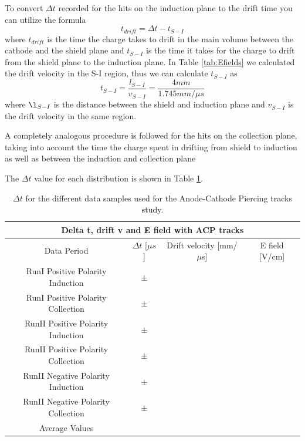 To convert $\Delta t$ recorded for the hits on the induction plane to the drift time you can utilize the formula
\begin{equation}
t_{drift} = \Delta t - t_{S-I}
\end{equation}
where $t_{drift}$ is the time the charge takes to drift in the main volume between the cathode and the shield plane and $t_{S-I}$ is the time it takes for the charge to drift from the shield plane to the induction plane. In Table \ref{tab:Efields} we calculated the drift velocity in the S-I region, thus we can calculate $t_{S-I}$ as 
\begin{equation}
t_{S-I} = \frac{l_{S-I}}{v_{S-I}} = \frac{4 mm}{1.745 mm/ \mu s}
\end{equation}
where $\l_{S-I}$ is the distance between the shield and induction plane and $v_{S-I}$ is the drift velocity in the same region.

A completely analogous procedure is followed for the hits on the collection plane, taking into account the time the charge spent in drifting from shield to induction as well as between the induction and collection plane

The $\Delta t$ value for each distribution is shown in Table \ref{tab:deltaTACP}.

\begin{center}
\begin{table}[htb]
  \begin{center}
    \begin{tabular}{|c|c|c|c|}
      \multicolumn{4}{c}{\textbf{Delta t, drift v and E field with ACP tracks}} \\
      \hline \hline
       Data Period  & $\Delta t$ [$\mu s$] & Drift velocity [mm/$\mu$s] & E field [V/cm] \\
       \hline
       RunI Positive Polarity Induction &  $\pm$   &  & \\
       \hline
       RunI Positive Polarity Collection &  $\pm$  &  &  \\
       \hline
       RunII Positive Polarity Induction &   $\pm$ &  &  \\
       \hline
       RunII Positive Polarity Collection &  $\pm$ &  &  \\
       \hline
       RunII Negative Polarity Induction &   $\pm$ &  &  \\
       \hline
       RunII Negative Polarity Collection &  $\pm$ &  &  \\
       \hline
       \hline
       Average Values & & & \\
       \hline
       \end{tabular}
    \caption{$\Delta t$ for the different data samples used for the Anode-Cathode Piercing tracks study. }
    \label{tab:deltaTACP}
    \end{center}
\end{table}
\end{center}


